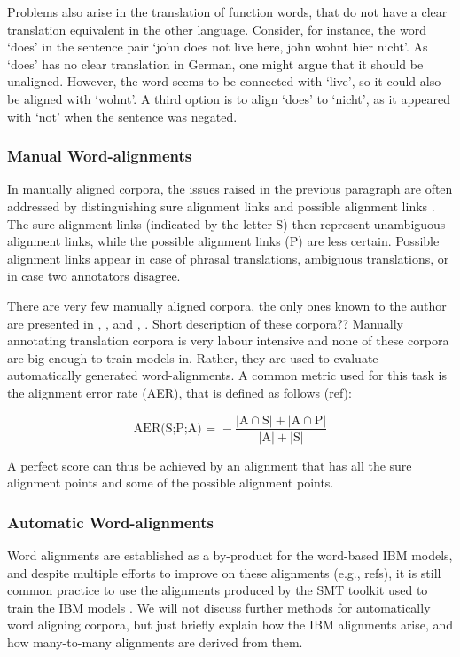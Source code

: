 \documentclass{report}
\theoremstyle{definition}
\theoremstyle{plain}
\begin{document}
Problems also arise in the translation of function words, that do not have a clear translation equivalent in the other language. Consider, for instance, the word `does' in the sentence pair `john does not live here, john wohnt hier nicht'. As `does' has no clear translation in German, one might argue that it should be unaligned. However, the word seems to be connected with `live', so it could also be aligned with `wohnt'. A third option is to align `does' to `nicht', as it appeared with `not' when the sentence was negated.\citep[Example from][p.114]{koehn2008statistical}

\subsubsection{Manual Word-alignments}

In manually aligned corpora, the issues raised in the previous paragraph are often addressed by distinguishing sure alignment links and possible alignment links \citep{lambert2005guidelines}. The sure alignment links (indicated by the letter S) then represent unambiguous alignment links, while the possible alignment links (P) are less certain. Possible alignment links appear in case of phrasal translations, ambiguous translations, or in case two annotators disagree. 

There are very few manually aligned corpora, the only ones known to the author are presented in \cite{och2000improved}, \cite{graca2008building}, \cite{mihalcea2003evaluation} and \cite{pado2006optimal}, \cite{ahrenberg2000evaluation}. Short description of these corpora??
Manually annotating translation corpora is very labour intensive and none of these corpora are big enough to train models in. Rather, they are used to evaluate automatically generated word-alignments. A common metric used for this task is the alignment error rate (AER), that is defined as follows (ref):

$$
\text{AER(S;P;A) = } - \frac{|\text{A}\cap\text{S}| + |\text{A}\cap\text{P}|}{|\text{A}| + |\text{S}|}
$$

A perfect score can thus be achieved by an alignment that has all the sure alignment points and some of the possible alignment points.

\subsubsection{Automatic Word-alignments}

Word alignments are established as a by-product for the word-based IBM models, and despite multiple efforts to improve on these alignments (e.g., refs), it is still common practice to use the alignments produced by the SMT toolkit used to train the IBM models \citep{och03:asc}. We will not discuss further methods for automatically word aligning corpora, but just briefly explain how the IBM alignments arise, and how many-to-many alignments are derived from them.
\end{document}
